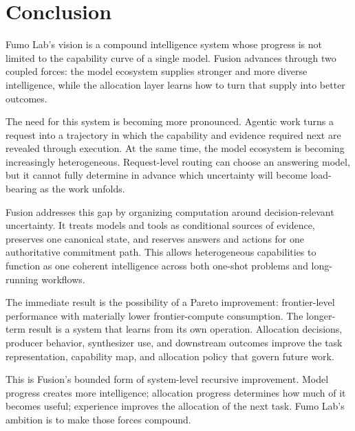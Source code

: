 \section{Conclusion}

Fumo Lab's vision is a compound intelligence system whose progress is not
limited to the capability curve of a single model. Fusion advances through two
coupled forces: the model ecosystem supplies stronger and more diverse
intelligence, while the allocation layer learns how to turn that supply into
better outcomes.

The need for this system is becoming more pronounced. Agentic work turns a
request into a trajectory in which the capability and evidence required next
are revealed through execution. At the same time, the model ecosystem is
becoming increasingly heterogeneous. Request-level routing can choose an
answering model, but it cannot fully determine in advance which uncertainty
will become load-bearing as the work unfolds.

Fusion addresses this gap by organizing computation around decision-relevant
uncertainty. It treats models and tools as conditional sources of evidence,
preserves one canonical state, and reserves answers and actions for one
authoritative commitment path. This allows heterogeneous capabilities to
function as one coherent intelligence across both one-shot problems and
long-running workflows.

The immediate result is the possibility of a Pareto improvement: frontier-level
performance with materially lower frontier-compute consumption. The longer-term
result is a system that learns from its own operation. Allocation decisions,
producer behavior, synthesizer use, and downstream outcomes improve the task
representation, capability map, and allocation policy that govern future work.

This is Fusion's bounded form of system-level recursive improvement. Model
progress creates more intelligence; allocation progress determines how much of
it becomes useful; experience improves the allocation of the next task. Fumo
Lab's ambition is to make those forces compound.
